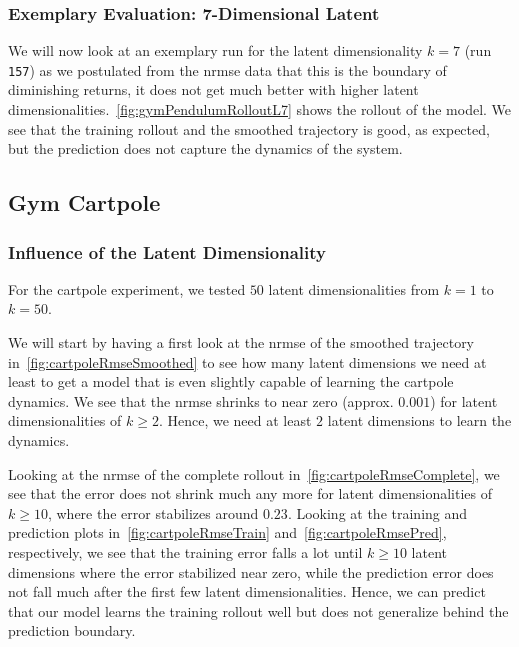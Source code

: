		\subsubsection{Exemplary Evaluation: 7-Dimensional Latent}
			\label{subsubsec:gymPendulumL07}

			We will now look at an exemplary run for the latent dimensionality \( k = 7 \) (run \texttt{157}) as we postulated from the \ac{nrmse} data that this is the boundary of diminishing returns, \ie it does not get much better with higher latent dimensionalities.~\autoref{fig:gymPendulumRolloutL7} shows the rollout of the model. We see that the training rollout and the smoothed trajectory is good, as expected, but the prediction does not capture the dynamics of the system.

	\subsection{Gym Cartpole} %
		\subsubsection{Influence of the Latent Dimensionality}
			\label{subsubsec:cartpoleLatents}

			For the cartpole experiment, we tested \(50\) latent dimensionalities from \( k = 1 \) to \( k = 50 \).

			We will start by having a first look at the \ac{nrmse} of the smoothed trajectory in~\autoref{fig:cartpoleRmseSmoothed} to see how many latent dimensions we need at least to get a model that is even slightly capable of learning the cartpole dynamics. We see that the \ac{nrmse} shrinks to near zero (approx. \(0.001\)) for latent dimensionalities of \( k \geq 2 \). Hence, we need at least \(2\) latent dimensions to learn the dynamics.

			Looking at the \ac{nrmse} of the complete rollout in~\autoref{fig:cartpoleRmseComplete}, we see that the error does not shrink much any more for latent dimensionalities of \( k \geq 10 \), where the error stabilizes around \(0.23\). Looking at the training and prediction plots in~\autoref{fig:cartpoleRmseTrain} and~\autoref{fig:cartpoleRmsePred}, respectively, we see that the training error falls a lot until \( k \geq 10 \) latent dimensions where the error stabilized near zero, while the prediction error does not fall much after the first few latent dimensionalities. Hence, we can predict that our model learns the training rollout well but does not generalize behind the prediction boundary.

